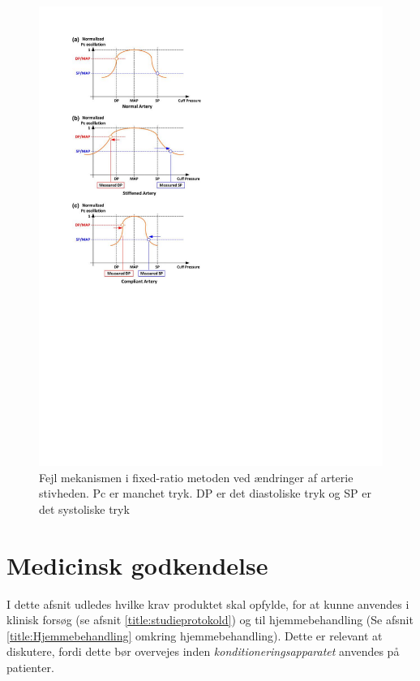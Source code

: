 \begin{minipage}[t]{0.5\textwidth}
	\begin{figure}[H]
		\centering
		\includegraphics[width=1\textwidth]{billeder/ErrorFixed-Ratio.pdf}
		\caption{Fejl mekanismen i fixed-ratio metoden ved ændringer af arterie stivheden. Pc er manchet tryk. DP er det diastoliske tryk og SP er det systoliske tryk}\label{fig:ErrorMechanismOfFixedRatio}
	\end{figure}
\end{minipage}

\section{Medicinsk godkendelse} \label{title:medGodkendelse}
I dette afsnit udledes hvilke krav produktet skal opfylde, for at kunne anvendes i klinisk forsøg (se afsnit \ref{title:studieprotokold}) og til hjemmebehandling (Se afsnit \ref{title:Hjemmebehandling} omkring hjemmebehandling). Dette er relevant at diskutere, fordi dette bør overvejes inden \textit{konditioneringsapparatet} anvendes på patienter.

